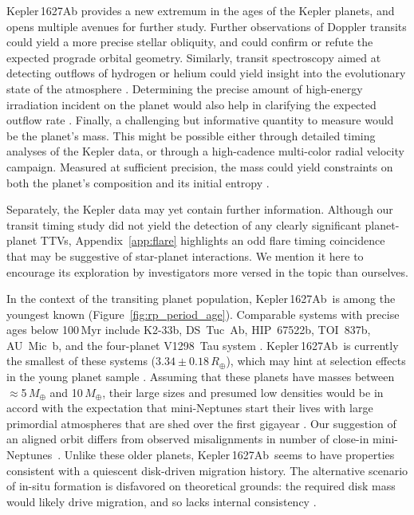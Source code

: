 \documentclass[12pt,modern,twocolumn,tighten]{aastex63}
\newcommand{\pn}{Kepler\,1627Ab} %
\begin{document}
Kepler\,1627Ab provides a new extremum in the ages of the Kepler
planets, and opens multiple avenues for further study.  Further
observations of Doppler transits could yield a more precise stellar
obliquity, and could confirm or refute the expected prograde orbital
geometry.  Similarly, transit spectroscopy aimed at detecting outflows
of hydrogen or helium could yield insight into the evolutionary state
of the atmosphere \citep[{\it
e.g.},][]{spake_helium_2018,vissapragada_2020}.  Determining the
precise amount of high-energy irradiation incident on the planet would
also help in clarifying the expected outflow rate \citep[{\it
e.g.},][]{poppenhaeger_2021}.  Finally, a challenging but informative
quantity to measure would be the planet's mass.  This might be
possible either through detailed timing analyses of the Kepler data,
or through a high-cadence multi-color radial velocity campaign.
Measured at sufficient precision, the mass could yield constraints on
both the planet's composition and its initial entropy
\citep{owen_constraining_2020}.

Separately, the Kepler data may yet contain further information.
Although our transit timing study did not yield the detection of any
clearly significant planet-planet TTVs, Appendix~\ref{app:flare}
highlights an odd flare timing coincidence that may be suggestive of
star-planet interactions.  We mention it here to encourage its
exploration by investigators more versed in the topic than ourselves.

In the context of the transiting planet population, \pn\ is among the
youngest known (Figure~\ref{fig:rp_period_age}).  Comparable systems
with precise ages below 100\,Myr include K2-33b, DS~Tuc~Ab,
HIP~67522b, TOI~837b, AU~Mic~b, and the four-planet V1298~Tau system
\citep{Mann_K2_33b_2016,David_et_al_2017,newton_tess_2019,david_four_2019,bouma_cluster_2020,plavchan_planet_2020}.
\pn\ is currently the smallest of these systems ($3.34\pm
0.18\,R_\oplus$), which may hint at selection effects in the young
planet sample \citep{zhou_2021_tois}.  Assuming that these planets
have masses between $\approx$5$\,M_\oplus$ and 10$\,M_\oplus$, their
large sizes and presumed low densities would be in accord with the
expectation that mini-Neptunes start their lives with large primordial
atmospheres that are shed over the first gigayear
\citep{Owen_Wu_2013,Fulton_et_al_2017,ginzburg_corepowered_2018}.  Our
suggestion of an aligned orbit differs from observed misalignments in
number of close-in
mini-Neptunes~\citep{sanchis-ojeda_starspots_2011,albrecht_obliquities_2012,dalal_2019_hd3167,rubenzahl_tess-keck_2021}.
Unlike these older planets, \pn\ seems to have properties consistent
with a quiescent disk-driven migration history.  The alternative
scenario of in-situ formation is disfavored on theoretical grounds:
the required disk mass would likely drive migration, and so lacks
internal consistency
\citep{inamdar_formation_2015,ogihara_reassessment_2015}.
\end{document}
